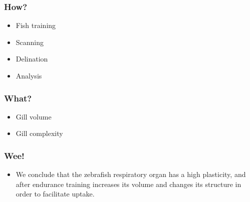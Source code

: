 \documentclass[aspectratio=169,10pt]{beamer}
\begin{document}
\begin{frame}
	\frametitle{How?}
	\begin{itemize}
		\item Fish training
		\item Scanning
		\item Delination
		\item Analysis
	\end{itemize}
\end{frame}

\begin{frame}
	\frametitle{What?}
	\begin{itemize}
		\item Gill volume
		\item Gill complexity
	\end{itemize}
\end{frame}

\begin{frame}
	\frametitle{Wee!}
	\begin{itemize}
		\item We conclude that the zebrafish respiratory organ has a high plasticity, and after endurance training increases its volume and changes its structure in order to facilitate  uptake.
	\end{itemize}
\end{frame}
\end{document}
